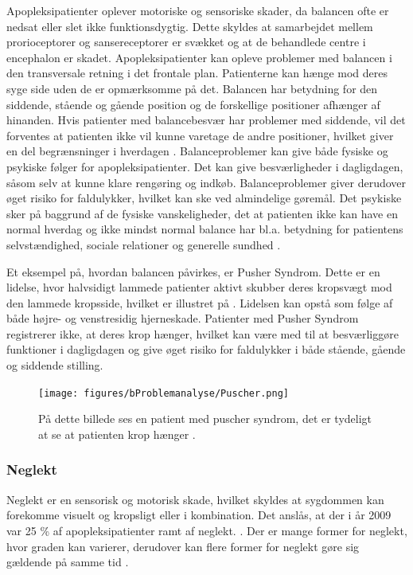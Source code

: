 Apopleksipatienter oplever motoriske og sensoriske skader, da balancen ofte er nedsat eller slet ikke funktionsdygtig.\cite{Karnath2003} Dette skyldes at samarbejdet mellem prorioceptorer og sansereceptorer er svækket og at de behandlede centre i encephalon er skadet. \cite{Martini2012}
Apopleksipatienter kan opleve problemer med balancen i den transversale retning i det frontale plan. Patienterne kan hænge mod deres syge side uden de er opmærksomme på det. Balancen har betydning for den siddende, stående og gående position og de forskellige positioner afhænger af hinanden. Hvis patienter med balancebesvær har problemer med siddende, vil det forventes at patienten ikke vil kunne varetage de andre positioner, hvilket giver en del begrænsninger i hverdagen \cite{Karnath2003} .
Balanceproblemer kan give både fysiske og psykiske følger for apopleksipatienter. Det kan give besværligheder i dagligdagen, såsom selv at kunne klare rengøring og indkøb. 
Balanceproblemer giver derudover øget risiko for faldulykker, hvilket kan ske ved almindelige gøremål.\cite{Karnath2003} Det psykiske sker på baggrund af de fysiske vanskeligheder, det at patienten ikke kan have en normal hverdag og ikke mindst normal balance har bl.a. betydning for patientens selvstændighed, sociale relationer og generelle sundhed .

Et eksempel på, hvordan balancen påvirkes, er Pusher Syndrom. Dette er en lidelse, hvor halvsidigt lammede patienter aktivt skubber deres kropsvægt mod den lammede kropsside, hvilket er illustret på . Lidelsen kan opstå som følge af både højre- og venstresidig hjerneskade. Patienter med Pusher Syndrom registrerer ikke, at deres krop hænger, hvilket kan være med til at besværliggøre funktioner i dagligdagen og give øget risiko for faldulykker i både stående, gående og siddende stilling. \cite{Karnath2003} 

\begin{figure}[H]
	\centering
	\texttt{[image: figures/bProblemanalyse/Puscher.png]}
	\caption{På dette billede ses en patient med puscher syndrom, det er tydeligt at se at patienten krop hænger \cite{Karnath2003}.}
	\label{pusher}
\end{figure}

\subsubsection{Neglekt}
Neglekt er en sensorisk og motorisk skade, hvilket skyldes at sygdommen kan forekomme visuelt og kropsligt eller i kombination.  Det anslås, at der i år 2009 var 25 \% af apopleksipatienter ramt af neglekt. \cite{Sundhedsstyrelsen2009}. Der er mange former for neglekt, hvor graden kan varierer, derudover kan flere former for neglekt gøre sig gældende på samme tid \cite{Sundhed.dk}.

